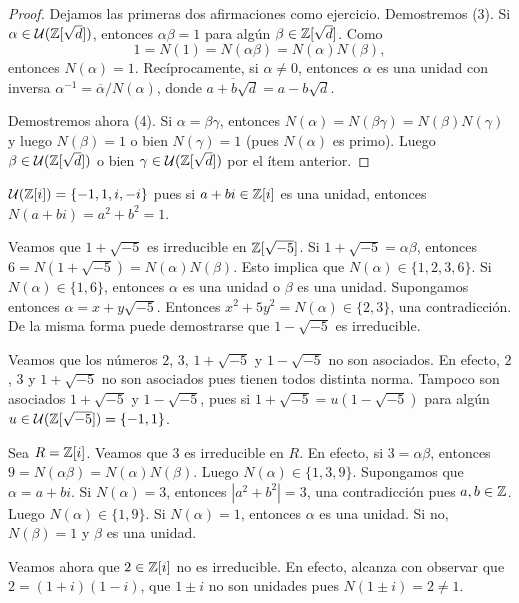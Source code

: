 \begin{proof}
Dejamos las primeras dos afirmaciones como ejercicio. Demostremos (3). Si $\alpha\in\mathcal{U}(\mathbb{Z}[\sqrt{d}])$, 
entonces $\alpha\beta=1$ para algún $\beta\in\mathbb{Z}[\sqrt{d}]$. Como
\[
1=N(1)=N(\alpha\beta)=N(\alpha)N(\beta),
\]
entonces $N(\alpha)=1$. Recíprocamente, si $\alpha\ne0$, entonces $\alpha$ es una unidad con inversa
$\alpha^{-1}=\overline{\alpha}/N(\alpha)$, 
donde $\overline{a+b\sqrt{d}}=a-b\sqrt{d}$.

Demostremos ahora (4). Si $\alpha=\beta\gamma$, entonces $N(\alpha)=N(\beta\gamma)=N(\beta)N(\gamma)$ y luego
$N(\beta)=1$ o bien $N(\gamma)=1$ (pues $N(\alpha)$ es primo). Luego
$\beta\in\mathcal{U}(\mathbb{Z}[\sqrt{d}])$ o bien $\gamma\in\mathcal{U}(\mathbb{Z}[\sqrt{d}])$ por el ítem anterior.
\end{proof}

\begin{example}
$\mathcal{U}(\mathbb{Z}[i])=\{-1,1,i,-i\}$ pues si $a+bi\in\mathbb{Z}[i]$ es una unidad, entonces $N(a+bi)=a^2+b^2=1$. 	
\end{example}

\begin{example}
Veamos que $1+\sqrt{-5}$ es irreducible en $\mathbb{Z}[\sqrt{-5}]$. Si $1+\sqrt{-5}=\alpha\beta$, entonces 
$6=N(1+\sqrt{-5})=N(\alpha)N(\beta)$. Esto implica que $N(\alpha)\in\{1,2,3,6\}$. Si $N(\alpha)\in\{1,6\}$, entonces
$\alpha$ es una unidad o $\beta$ es una unidad. Supongamos entonces 
$\alpha=x+y\sqrt{-5}$. Entonces 
$x^2+5y^2=N(\alpha)\in\{2,3\}$, una contradicción. De la misma forma puede demostrarse que $1-\sqrt{-5}$ 
es irreducible. 

Veamos que los números 
$2$, $3$, $1+\sqrt{-5}$ y $1-\sqrt{-5}$ no son asociados. En efecto, $2$, $3$ y $1+\sqrt{-5}$ no son asociados
pues tienen todos distinta norma. Tampoco son asociados $1+\sqrt{-5}$ y $1-\sqrt{-5}$, pues si 
$1+\sqrt{-5}=u(1-\sqrt{-5})$ para algún $u\in\mathcal{U}(\mathbb{Z}[\sqrt{-5}])=\{-1,1\}$. 
\end{example}

\begin{example}
Sea $R=\mathbb{Z}[i]$. 
Veamos que $3$ es irreducible en $R$. En efecto, si $3=\alpha\beta$, entonces
$9=N(\alpha\beta)=N(\alpha)N(\beta)$. Luego $N(\alpha)\in\{1,3,9\}$. Supongamos que $\alpha=a+bi$. Si $N(\alpha)=3$, entonces $|a^2+b^2|=3$, una contradicción pues $a,b\in\mathbb{Z}$. Luego $N(\alpha)\in\{1,9\}$. Si $N(\alpha)=1$, entonces $\alpha$ es una unidad. Si no, $N(\beta)=1$ y $\beta$ es una unidad. 	

Veamos ahora que $2\in\mathbb{Z}[i]$ no es irreducible. En efecto, alcanza con observar que $2=(1+i)(1-i)$, que 
$1\pm i$ no son unidades pues $N(1\pm i)=2\ne 1$. 
\end{example}

